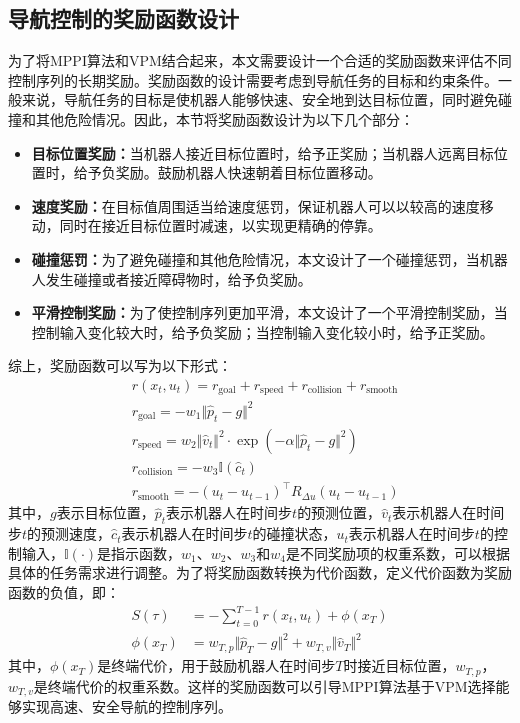 \subsection{导航控制的奖励函数设计}
为了将MPPI算法和VPM结合起来，本文需要设计一个合适的奖励函数来评估不同控制序列的长期奖励。奖励函数的设计需要考虑到导航任务的目标和约束条件。一般来说，导航任务的目标是使机器人能够快速、安全地到达目标位置，同时避免碰撞和其他危险情况。因此，本节将奖励函数设计为以下几个部分：
\begin{itemize}
    \item \textbf{目标位置奖励：}当机器人接近目标位置时，给予正奖励；当机器人远离目标位置时，给予负奖励。鼓励机器人快速朝着目标位置移动。
    \item \textbf{速度奖励：}在目标值周围适当给速度惩罚，保证机器人可以以较高的速度移动，同时在接近目标位置时减速，以实现更精确的停靠。
    \item \textbf{碰撞惩罚：}为了避免碰撞和其他危险情况，本文设计了一个碰撞惩罚，当机器人发生碰撞或者接近障碍物时，给予负奖励。
    \item \textbf{平滑控制奖励：}为了使控制序列更加平滑，本文设计了一个平滑控制奖励，当控制输入变化较大时，给予负奖励；当控制输入变化较小时，给予正奖励。
\end{itemize}
综上，奖励函数可以写为以下形式：
{
\allowdisplaybreaks
\begin{subequations}
\begin{align}
    &r(x_t, u_t) = r_{\text{goal}} +  r_{\text{speed}} +  r_{\text{collision}} + r_{\text{smooth}} \\
    &r_{\text{goal}} = -w_1 \Vert \hat{p}_t - g \Vert^2 \\
    &r_{\text{speed}} = w_2\Vert \hat{v}_t \Vert^2 \cdot \exp(-\alpha \Vert \hat{p}_t - g \Vert^2) \\ \label{subequ:speed-penalty}
    &r_{\text{collision}} = -w_3\mathbb{I}(\hat{c}_t) \\
    &r_{\text{smooth}} = -(u_t - u_{t-1})^\top R_{\Delta u} (u_t - u_{t-1}) \label{subequ:control-smooth}
\end{align}
\end{subequations}
}
其中，$g$表示目标位置，$\hat{p}_t$表示机器人在时间步$t$的预测位置，$\hat{v}_t$表示机器人在时间步$t$的预测速度，$\hat{c}_t$表示机器人在时间步$t$的碰撞状态，$u_t$表示机器人在时间步$t$的控制输入，$\mathbb{I}(\cdot)$是指示函数，$w_1$、$w_2$、$w_3$和$w_4$是不同奖励项的权重系数，可以根据具体的任务需求进行调整。为了将奖励函数转换为代价函数，定义代价函数为奖励函数的负值，即：
\begin{equation}
\begin{aligned}
    S(\tau) &= -\sum_{t=0}^{T-1} r(x_t, u_t) + \phi(x_T) \\
    \phi(x_T) &= w_{T, p} \Vert \hat{p}_T - g \Vert^2 + w_{T, v} \Vert \hat{v}_T \Vert^2
\end{aligned}
\end{equation}
其中，$\phi(x_T)$是终端代价，用于鼓励机器人在时间步$T$时接近目标位置，$w_{T, p}$，$w_{T, v}$是终端代价的权重系数。这样的奖励函数可以引导MPPI算法基于VPM选择能够实现高速、安全导航的控制序列。


